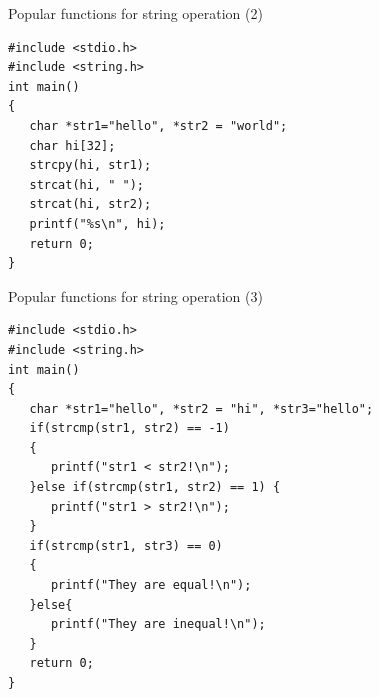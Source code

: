 \begin{frame}[fragile]{Popular functions for string operation (2)}

\begin{center}
\end{center}
\vspace{0.15in}
\begin{lstlisting}[xleftmargin=0.05\linewidth, linewidth=0.95\linewidth]
#include <stdio.h>
#include <string.h>
int main()
{
   char *str1="hello", *str2 = "world";
   char hi[32];
   strcpy(hi, str1);
   strcat(hi, " ");
   strcat(hi, str2);
   printf("%s\n", hi);
   return 0;
}
\end{lstlisting}
\end{frame}

\begin{frame}[fragile]{Popular functions for string operation (3)}
\vspace{-0.2in}
\begin{center}
\end{center}
\begin{lstlisting}[xleftmargin=0.05\linewidth, linewidth=0.95\linewidth]
#include <stdio.h>
#include <string.h>
int main()
{
   char *str1="hello", *str2 = "hi", *str3="hello";
   if(strcmp(str1, str2) == -1)
   {
      printf("str1 < str2!\n");
   }else if(strcmp(str1, str2) == 1) {
      printf("str1 > str2!\n");
   }
   if(strcmp(str1, str3) == 0)
   {
      printf("They are equal!\n");
   }else{
      printf("They are inequal!\n");
   }
   return 0;
}
\end{lstlisting}
\end{frame}


